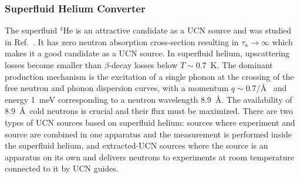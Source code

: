 \subsubsection{Superfluid Helium Converter}
The superfluid $^4$He is an attractive candidate as a UCN source and
was studied in Ref.~\cite{Golub77}.
It has zero neutron absorption cross-section resulting in $\tau_a
\rightarrow \infty$ which makes it a good candidate as a UCN source.
In superfluid helium, upscattering losses become smaller than
$\beta$-decay losses below $T \sim 0.7$~K.  The dominant production
mechanism is the excitation of a single phonon at the crossing of the
free neutron and phonon dispersion curves, with a momentum $q\sim
0.7$/\AA~\cite{Brome2001} and energy 1~meV corresponding to a
neutron wavelength 8.9~\AA. The availability of 8.9~\AA~cold neutrons
is crucial and their flux must be maximized.
There are two types of UCN sources based on superfluid helium: sources
where experiment and source are combined in one apparatus and the
measurement is performed inside the superfluid helium, and
extracted-UCN sources where the source is an apparatus on its own and
delivers neutrons to experiments at room temperature connected to it
by UCN guides.



